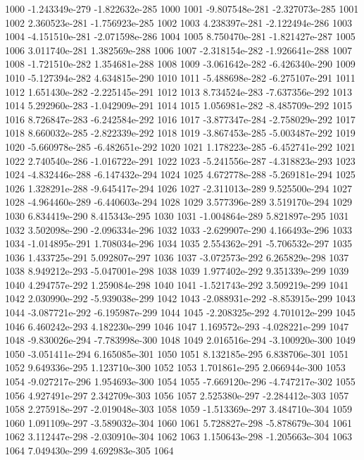 \documentclass{article}
\begin{document}
\begin{Schunk}
\begin{Soutput}
1000 -1.243349e-279 -1.822632e-285 1000
1001 -9.807548e-281 -2.327073e-285 1001
1002  2.360523e-281 -1.756923e-285 1002
1003  4.238397e-281 -2.122494e-286 1003
1004 -4.151510e-281 -2.071598e-286 1004
1005  8.750470e-281 -1.821427e-287 1005
1006  3.011740e-281  1.382569e-288 1006
1007 -2.318154e-282 -1.926641e-288 1007
1008 -1.721510e-282  1.354681e-288 1008
1009 -3.061642e-282 -6.426340e-290 1009
1010 -5.127394e-282  4.634815e-290 1010
1011 -5.488698e-282 -6.275107e-291 1011
1012  1.651430e-282 -2.225145e-291 1012
1013  8.734524e-283 -7.637356e-292 1013
1014  5.292960e-283 -1.042909e-291 1014
1015  1.056981e-282 -8.485709e-292 1015
1016  8.726847e-283 -6.242584e-292 1016
1017 -3.877347e-284 -2.758029e-292 1017
1018  8.660032e-285 -2.822339e-292 1018
1019 -3.867453e-285 -5.003487e-292 1019
1020 -5.660978e-285 -6.482651e-292 1020
1021  1.178223e-285 -6.452741e-292 1021
1022  2.740540e-286 -1.016722e-291 1022
1023 -5.241556e-287 -4.318823e-293 1023
1024 -4.832446e-288 -6.147432e-294 1024
1025  4.672778e-288 -5.269181e-294 1025
1026  1.328291e-288 -9.645417e-294 1026
1027 -2.311013e-289  9.525500e-294 1027
1028 -4.964460e-289 -6.440603e-294 1028
1029  3.577396e-289  3.519170e-294 1029
1030  6.834419e-290  8.415343e-295 1030
1031 -1.004864e-289  5.821897e-295 1031
1032  3.502098e-290 -2.096334e-296 1032
1033 -2.629907e-290  4.166493e-296 1033
1034 -1.014895e-291  1.708034e-296 1034
1035  2.554362e-291 -5.706532e-297 1035
1036  1.433725e-291  5.092807e-297 1036
1037 -3.072573e-292  6.265829e-298 1037
1038  8.949212e-293 -5.047001e-298 1038
1039  1.977402e-292  9.351339e-299 1039
1040  4.294757e-292  1.259084e-298 1040
1041 -1.521743e-292  3.509219e-299 1041
1042  2.030990e-292 -5.939038e-299 1042
1043 -2.088931e-292 -8.853915e-299 1043
1044 -3.087721e-292 -6.195987e-299 1044
1045 -2.208325e-292  4.701012e-299 1045
1046  6.460242e-293  4.182230e-299 1046
1047  1.169572e-293 -4.028221e-299 1047
1048 -9.830026e-294 -7.783998e-300 1048
1049  2.016516e-294 -3.100920e-300 1049
1050 -3.051411e-294  6.165085e-301 1050
1051  8.132185e-295  6.838706e-301 1051
1052  9.649336e-295  1.123710e-300 1052
1053  1.701861e-295  2.066944e-300 1053
1054 -9.027217e-296  1.954693e-300 1054
1055 -7.669120e-296 -4.747217e-302 1055
1056  4.927491e-297  2.342709e-303 1056
1057  2.525380e-297 -2.284412e-303 1057
1058  2.275918e-297 -2.019048e-303 1058
1059 -1.513369e-297  3.484710e-304 1059
1060  1.091109e-297 -3.589032e-304 1060
1061  5.728827e-298 -5.878679e-304 1061
1062  3.112447e-298 -2.030910e-304 1062
1063  1.150643e-298 -1.205663e-304 1063
1064  7.049430e-299  4.692983e-305 1064

\end{Soutput}
\end{Schunk}
\end{document}
